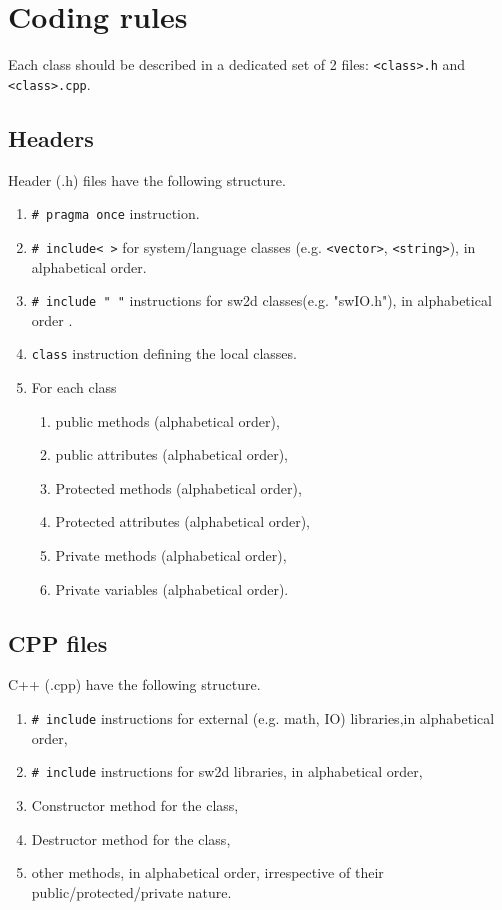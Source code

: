 %
%
%
%
\section{Coding rules}

Each class should be described in a dedicated set of 2 files: \texttt{<class>.h} and \texttt{<class>.cpp}.
%
%
%
\subsection{Headers}

Header (.h) files have the following structure.
\begin{enumerate}
	\item \texttt{\# pragma once} instruction.
	\item \texttt{\# include< >} for system/language classes (e.g. \texttt{<vector>}, \texttt{<string>}), in alphabetical order.
	\item \texttt{\# include " "} instructions for sw2d classes(e.g. "swIO.h"), in alphabetical order .
	\item \texttt{class} instruction defining the local classes.
	\item For each class
	\begin{enumerate}
	\item public methods (alphabetical order),
	\item public attributes (alphabetical order),
	\item Protected methods (alphabetical order),
	\item Protected attributes (alphabetical order),
	\item Private methods (alphabetical order),
	\item Private variables (alphabetical order).
	\end{enumerate}
\end{enumerate}
%
%
%
\subsection{CPP files}

C++ (.cpp) have the following structure.

\begin{enumerate}
	\item \texttt{\# include} instructions for external (e.g. math, IO) libraries,in alphabetical order,
	\item \texttt{\# include} instructions for sw2d libraries, in alphabetical order,
	\item Constructor method for the class,
	\item Destructor method for the class,
	\item other methods, in alphabetical order, irrespective of their public/protected/private nature.
\end{enumerate}
%
%
%
